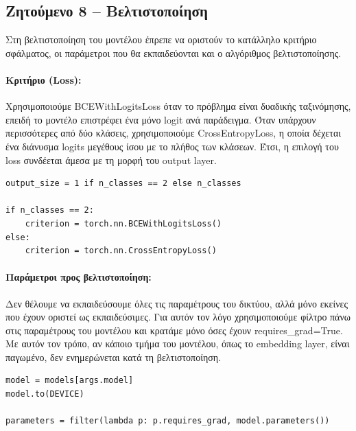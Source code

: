 \documentclass[11pt,a4paper]{article}
\begin{document}
\subsection*{Ζητούμενο 8 -- Βελτιστοποίηση}

Στη βελτιστοποίηση του μοντέλου έπρεπε να οριστούν το κατάλληλο κριτήριο σφάλματος, οι παράμετροι που θα εκπαιδεύονται και ο αλγόριθμος βελτιστοποίησης.

\paragraph{Κριτήριο (\textlatin{Loss}):}
Χρησιμοποιούμε \textlatin{BCEWithLogitsLoss} όταν το πρόβλημα είναι δυαδικής ταξινόμησης, επειδή το μοντέλο επιστρέφει ένα 
μόνο \textlatin{logit} ανά παράδειγμα. Όταν υπάρχουν περισσότερες από δύο κλάσεις, χρησιμοποιούμε \textlatin{CrossEntropyLoss}, η οποία 
δέχεται ένα διάνυσμα \textlatin{logits} μεγέθους ίσου με το πλήθος των κλάσεων. Έτσι, η επιλογή του \textlatin{loss} συνδέεται άμεσα με τη 
μορφή του \textlatin{output layer}.

\begin{lstlisting}[caption={Code for loss selection (main.py)}]
output_size = 1 if n_classes == 2 else n_classes

if n_classes == 2:
    criterion = torch.nn.BCEWithLogitsLoss()
else:
    criterion = torch.nn.CrossEntropyLoss()
\end{lstlisting}

\paragraph{Παράμετροι προς βελτιστοποίηση:}
Δεν θέλουμε να εκπαιδεύσουμε όλες τις παραμέτρους του δικτύου, αλλά μόνο εκείνες που έχουν οριστεί ως εκπαιδεύσιμες. Για αυτόν τον λόγο 
χρησιμοποιούμε φίλτρο πάνω στις παραμέτρους του μοντέλου και κρατάμε μόνο όσες έχουν \textlatin{requires\_grad=True}. Με αυτόν τον τρόπο, 
αν κάποιο τμήμα του μοντέλου, όπως το \textlatin{embedding layer}, είναι παγωμένο, δεν ενημερώνεται κατά τη βελτιστοποίηση.

\begin{lstlisting}[caption={Code for parameter selection (main.py)}]
model = models[args.model]
model.to(DEVICE)

parameters = filter(lambda p: p.requires_grad, model.parameters())
\end{lstlisting}
\end{document}
